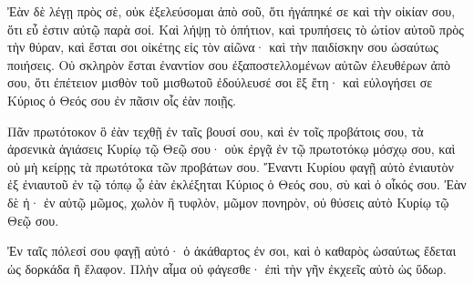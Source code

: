 {Ἐὰν δὲ λέγῃ πρὸς σὲ, οὐκ ἐξελεύσομαι ἀπὸ σοῦ, ὅτι ἠγάπηκέ σε καὶ τὴν οἰκίαν σου, ὅτι εὖ ἐστιν αὐτῷ παρὰ σοί.
Καὶ λήψῃ τὸ ὀπήτιον, καὶ τρυπήσεις τὸ ὠτίον αὐτοῦ πρὸς τὴν θύραν, καὶ ἔσται σοι οἰκέτης εἰς τὸν αἰῶνα· καὶ τὴν παιδίσκην σου ὡσαύτως ποιήσεις.
Οὐ σκληρὸν ἔσται ἐναντίον σου ἐξαποστελλομένων αὐτῶν ἐλευθέρων ἀπὸ σου, ὅτι ἐπέτειον μισθὸν τοῦ μισθωτοῦ ἐδούλευσέ σοι ἓξ ἔτη· καὶ εὐλογήσει σε Κύριος ὁ Θεός σου ἐν πᾶσιν οἷς ἐὰν ποιῇς.
\par }{\PP {}Πᾶν πρωτότοκον ὃ ἐὰν τεχθῇ ἐν ταῖς βουσί σου, καὶ ἐν τοῖς προβάτοις σου, τὰ ἀρσενικὰ ἁγιάσεις Κυρίῳ τῷ Θεῷ σου· οὐκ ἐργᾷ ἐν τῷ πρωτοτόκῳ μόσχῳ σου, καὶ οὐ μὴ κείρῃς τὰ πρωτότοκα τῶν προβάτων σου.
Ἔναντι Κυρίου φαγῇ αὐτὸ ἐνιαυτὸν ἐξ ἐνιαυτοῦ ἐν τῷ τόπῳ ᾧ ἐὰν ἐκλέξηται Κύριος ὁ Θεός σου, σὺ καὶ ὁ οἶκός σου.
Ἐὰν δὲ ἠ· ἐν αὐτῷ μῶμος, χωλὸν ἢ τυφλὸν, μῶμον πονηρὸν, οὐ θύσεις αὐτὸ Κυρίῳ τῷ Θεῷ σου.
\par }{\PP {}Ἐν ταῖς πόλεσί σου φαγῇ αὐτό· ὁ ἀκάθαρτος ἐν σοι, καὶ ὁ καθαρὸς ὡσαύτως ἔδεται ὡς δορκάδα ἢ ἔλαφον.
Πλὴν αἷμα οὐ φάγεσθε· ἐπὶ τὴν γῆν ἐκχεεῖς αὐτὸ ὡς ὕδωρ.

}

